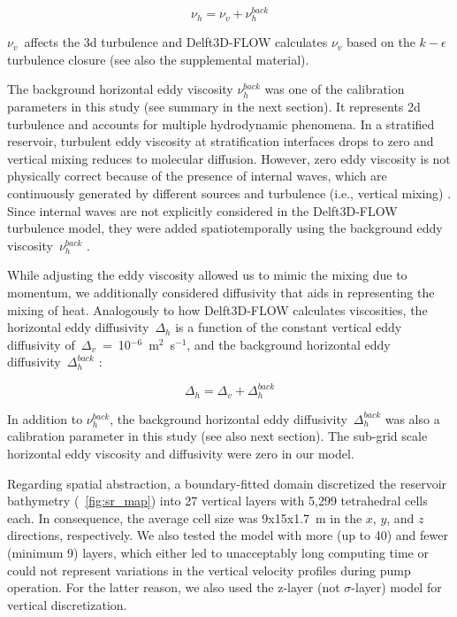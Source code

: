 \documentclass[draft,linenumbers,onecolumn]{agujournal2019} %
\begin{document}
\begin{equation}
	\label{eq:nuh}
	\nu_{h} = \nu_{v} + \nu_{h}^{back}
\end{equation}

$\nu_{v}$~affects the 3d turbulence and Delft3D-FLOW calculates $\nu_{v}$ based on the $k-\epsilon$ turbulence closure (see also the supplemental material).

The background horizontal eddy viscosity $\nu_{h}^{back}$ was one of the calibration parameters in this study (see summary in the next section). It represents 2d turbulence and accounts for multiple hydrodynamic phenomena. In a stratified reservoir, turbulent eddy viscosity at stratification interfaces drops to zero and vertical mixing reduces to molecular diffusion. However, zero eddy viscosity is not physically correct because of the presence of internal waves, which are continuously generated by different sources and turbulence (i.e., vertical mixing) \cite{hodges_modeling_2000}. Since internal waves are not explicitly considered in the Delft3D-FLOW turbulence model, they were added spatiotemporally using the background eddy viscosity~$\nu_{h}^{back}$ \cite{deltares_simulation_2022}.

While adjusting the eddy viscosity allowed us to mimic the mixing due to momentum, we additionally considered diffusivity that aids in representing the mixing of heat. Analogously to how Delft3D-FLOW calculates viscosities, the horizontal eddy diffusivity~$\Delta_{h}$ is a function of the constant vertical eddy diffusivity of~$\Delta_{v}$~=~10$^{-6}$~m$^{2}$~s$^{-1}$, and the background horizontal eddy diffusivity~$\Delta_{h}^{back}$ \cite{deltares_simulation_2022}:

\begin{equation}
	\label{eq:Duh}
	\Delta_{h} = \Delta_{v} + \Delta_{h}^{back}
\end{equation}

In addition to $\nu_{h}^{back}$, the background horizontal eddy diffusivity~$\Delta_{h}^{back}$ was also a calibration parameter in this study (see also next section). The sub-grid scale horizontal eddy viscosity and diffusivity were zero in our model.

Regarding spatial abstraction, a boundary-fitted domain discretized the reservoir bathymetry (\figurename{~\ref{fig:sr_map}}) into 27 vertical layers with 5,299 tetrahedral cells each. In consequence, the average cell size was 9x15x1.7~m in the $x$, $y$, and $z$ directions, respectively. We also tested the model with more (up to 40) and fewer (minimum 9) layers, which either led to unacceptably long computing time or could not represent variations in the vertical velocity profiles during pump operation. For the latter reason, we also used the z-layer (not $\sigma$-layer) model for vertical discretization.
\end{document}

